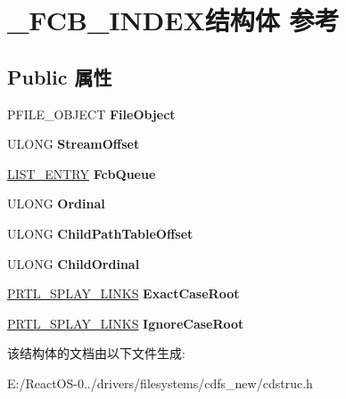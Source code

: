 \hypertarget{struct___f_c_b___i_n_d_e_x}{}\section{\+\_\+\+F\+C\+B\+\_\+\+I\+N\+D\+E\+X结构体 参考}
\label{struct___f_c_b___i_n_d_e_x}
\subsection*{Public 属性}
\begin{DoxyCompactItemize}
\item 
\mbox{\label{struct___f_c_b___i_n_d_e_x_a058d70ed9c93edd389f35639a984abda}} 
P\+F\+I\+L\+E\+\_\+\+O\+B\+J\+E\+CT {\bfseries File\+Object}
\item 
\mbox{\label{struct___f_c_b___i_n_d_e_x_a1796c3756ea18bbe7b20761521b0bf38}} 
U\+L\+O\+NG {\bfseries Stream\+Offset}
\item 
\mbox{\label{struct___f_c_b___i_n_d_e_x_a019b4ff3942b43f7a68b85c2b4ef1869}} 
\hyperlink{struct___l_i_s_t___e_n_t_r_y}{L\+I\+S\+T\+\_\+\+E\+N\+T\+RY} {\bfseries Fcb\+Queue}
\item 
\mbox{\label{struct___f_c_b___i_n_d_e_x_a52c5c156b5aa5260540191254ce846b3}} 
U\+L\+O\+NG {\bfseries Ordinal}
\item 
\mbox{\label{struct___f_c_b___i_n_d_e_x_a5606a05ea9d5c3f0c398177a601c0703}} 
U\+L\+O\+NG {\bfseries Child\+Path\+Table\+Offset}
\item 
\mbox{\label{struct___f_c_b___i_n_d_e_x_aecdf72f3f51d00a3b2399535ea6b61fa}} 
U\+L\+O\+NG {\bfseries Child\+Ordinal}
\item 
\mbox{\label{struct___f_c_b___i_n_d_e_x_a9ed06e0955f85e0d1170ed587a5830d3}} 
\hyperlink{struct___r_t_l___s_p_l_a_y___l_i_n_k_s}{P\+R\+T\+L\+\_\+\+S\+P\+L\+A\+Y\+\_\+\+L\+I\+N\+KS} {\bfseries Exact\+Case\+Root}
\item 
\mbox{\label{struct___f_c_b___i_n_d_e_x_a7facfa42a13f9af7478265cdc0e2fcc6}} 
\hyperlink{struct___r_t_l___s_p_l_a_y___l_i_n_k_s}{P\+R\+T\+L\+\_\+\+S\+P\+L\+A\+Y\+\_\+\+L\+I\+N\+KS} {\bfseries Ignore\+Case\+Root}
\end{DoxyCompactItemize}


该结构体的文档由以下文件生成\+:\begin{DoxyCompactItemize}
\item 
E\+:/\+React\+O\+S-\/0../drivers/filesystems/cdfs\+\_\+new/cdstruc.\+h\end{DoxyCompactItemize}
